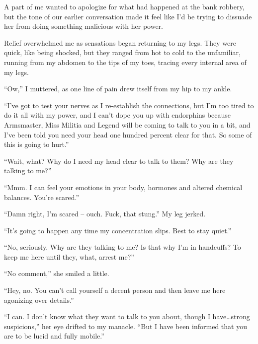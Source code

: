 A part of me wanted to apologize for what had happened at the bank robbery, but the tone of our earlier conversation made it feel like I'd be trying to dissuade her from doing something malicious with her power.



Relief overwhelmed me as sensations began returning to my legs.  They were quick, like being shocked, but they ranged from hot to cold to the unfamiliar, running from my abdomen to the tips of my toes, tracing every internal area of my legs.



``Ow,'' I muttered, as one line of pain drew itself from my hip to my ankle.



``I've got to test your nerves as I re-establish the connections, but I'm too tired to do it all with my power, and I can't dope you up with endorphins because Armsmaster, Miss Militia and Legend will be coming to talk to you in a bit, and I've been told you need your head one hundred percent clear for that.  So some of this is going to hurt.''



``Wait, what?  Why do I need my head clear to talk to them?  Why are they talking to me?''



``Mmm.  I can feel your emotions in your body, hormones and altered chemical balances.  You're scared.''



``Damn right, I'm scared – ouch.  Fuck, that stung.''  My leg jerked.



``It's going to happen any time my concentration slips.  Best to stay quiet.''



``No, seriously.  Why are they talking to me?  Is that why I'm in handcuffs?  To keep me here until they, what, arrest me?''



``No comment,'' she smiled a little.



``Hey, no.  You can't call yourself a decent person and then leave me here agonizing over details.''



``I can.  I don't know what they want to talk to you about, though I have\ldots strong suspicions,'' her eye drifted to my manacle.  ``But I have been informed that you are to be lucid and fully mobile.''



